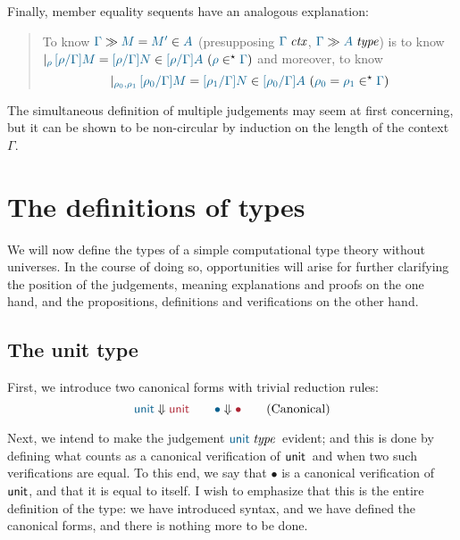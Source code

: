 Finally, member equality sequents have an analogous explanation:

\begin{quote}
  To know $\sequent{\Gamma}{\ever{M}{M'}{A}}$ (presupposing $\isctx\Gamma$, $\sequent{\Gamma}{\isset{A}}$) is to know
  $
    \genj{\rho}{
      \hyp{
        \ever{[\rho/\Gamma]M}{[\rho/\Gamma]N}{[\rho/\Gamma]A}
      }{
        \isenv{\rho}{\Gamma}
      }
    }
  $
  and moreover, to know
  \[
    \genj{\rho_0,\rho_1}{
      \hyp{
        \ever{[\rho_0/\Gamma]M}{[\rho_1/\Gamma]N}{[\rho_0/\Gamma]A}
      }{
        \eqenv{\rho_0}{\rho_1}{\Gamma}
      }
    }
  \]
\end{quote}

The simultaneous definition of multiple judgements may seem at first
concerning, but it can be shown to be non-circular by induction on the length
of the context $\Gamma$.

\section{The definitions of types}

We will now define the types of a simple computational type theory without
universes. In the course of doing so, opportunities will arise for further
clarifying the position of the judgements, meaning explanations and proofs on
the one hand, and the propositions, definitions and verifications on the other
hand.

\subsection{The unit type}

First, we introduce two canonical forms with trivial reduction rules:
\begin{equation}
  \reduce\tyunit\tyunit\qquad
  \reduce\bullet\bullet
  \tag{Canonical}
\end{equation}

Next, we intend to make the judgement $\isset\tyunit$\ evident; and this is done by
defining what counts as a canonical verification of $\mathsf{unit}$\ and when two such
verifications are equal. To this end, we say that $\bullet$ is a canonical
verification of $\mathsf{unit}$, and that it is equal to itself.  I wish to emphasize
that this is the entire definition of the type: we have introduced syntax, and
we have defined the canonical forms, and there is nothing more to be done.

